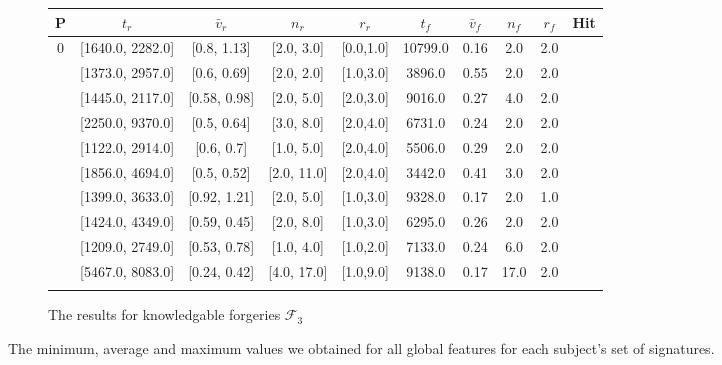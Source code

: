 \documentclass[a4paper, oneside]{csthesis}
\newcommand{\xmark}{\ding{55}}%
\begin{document}
\begin{figure}
    \begin{subfigure}[b]{\textwidth}
            \centering
            \tabcolsep 4pt
            \small
            \begin{tabular}{c|cccc||cccc||c}
            \hline
            \textbf{P} & $t_r$ & $\bar{v}_r$ & $n_r$ & $r_r$ & $t_f$ & $\bar{v}_f$ & $n_f$ & $r_f$ & Hit \\
            \hline
            0 & [1640.0, 2282.0] & [0.8, 1.13] & [2.0, 3.0] & [0.0,1.0] & 10799.0 & 0.16 & 2.0 & 2.0 & \xmark \\ \hdashline[0.5pt/3pt]
            1 & [1373.0, 2957.0] & [0.6, 0.69] & [2.0, 2.0] & [1.0,3.0] & 3896.0 & 0.55 & 2.0 & 2.0 & \xmark \\ \hdashline[0.5pt/3pt]
            2 & [1445.0, 2117.0] & [0.58, 0.98] & [2.0, 5.0] & [2.0,3.0] & 9016.0 & 0.27 & 4.0 & 2.0 & \xmark \\ \hdashline[0.5pt/3pt]
            3 & [2250.0, 9370.0] & [0.5, 0.64] & [3.0, 8.0] & [2.0,4.0] & 6731.0 & 0.24 & 2.0 & 2.0 & \xmark \\ \hdashline[0.5pt/3pt]
            4 & [1122.0, 2914.0] & [0.6, 0.7] & [1.0, 5.0] & [2.0,4.0] & 5506.0 & 0.29 & 2.0 & 2.0 & \xmark \\ \hdashline[0.5pt/3pt]
            5 & [1856.0, 4694.0] & [0.5, 0.52] & [2.0, 11.0] & [2.0,4.0] & 3442.0 & 0.41 & 3.0 & 2.0 & \xmark \\ \hdashline[0.5pt/3pt]
            6 & [1399.0, 3633.0] & [0.92, 1.21] & [2.0, 5.0] & [1.0,3.0] & 9328.0 & 0.17 & 2.0 & 1.0 & \xmark \\ \hdashline[0.5pt/3pt]
            7 & [1424.0, 4349.0] & [0.59, 0.45] & [2.0, 8.0] & [1.0,3.0] & 6295.0 & 0.26 & 2.0 & 2.0 & \xmark \\ \hdashline[0.5pt/3pt]
            8 & [1209.0, 2749.0] & [0.53, 0.78] & [1.0, 4.0] & [1.0,2.0] & 7133.0 & 0.24 & 6.0 & 2.0 & \xmark \\ \hdashline[0.5pt/3pt]
            9 & [5467.0, 8083.0] & [0.24, 0.42] & [4.0, 17.0] & [1.0,9.0] & 9138.0 & 0.17 & 17.0 & 2.0 & \xmark \\ \hdashline[0.5pt/3pt]
            \hline
            \end{tabular}
            \label{tbl:global-features-forg-knowledgable}
            \caption{The results for knowledgable forgeries $\mathcal{F}_3$}
    \end{subfigure}%


    \caption{The minimum, average and maximum values we obtained for all global features for each subject's set of signatures.}
    \label{fig:global-features-forgeries}
\end{figure}
\end{document}
